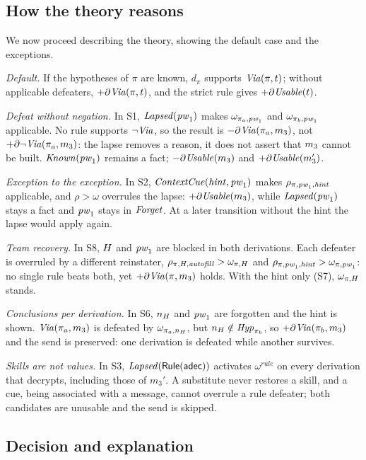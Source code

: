 \subsection{How the theory reasons}
\label{sec:patterns}
We now proceed describing the theory, showing the default case and the exceptions.

\emph{Default.} If the hypotheses of $\pi$ are known, $d_\pi$ supports $\mathit{Via}(\pi,t)$; without applicable defeaters, $+\partial\mathit{Via}(\pi,t)$, and the strict rule gives $+\partial\mathit{Usable}(t)$.

\emph{Defeat without negation.} In S1, $\mathit{Lapsed}(\mathit{pw}_1)$ makes $\omega_{\pi_a,\mathit{pw}_1}$ and $\omega_{\pi_b,\mathit{pw}_1}$ applicable. No rule supports $\neg\mathit{Via}$, so the result is $-\partial\mathit{Via}(\pi_a,m_3)$, not $+\partial\neg\mathit{Via}(\pi_a,m_3)$: the lapse removes a reason, it does not assert that $m_3$ cannot be built. $\mathit{Known}(\mathit{pw}_1)$ remains a fact; $-\partial\mathit{Usable}(m_3)$ and $+\partial\mathit{Usable}(m_3')$.

\emph{Exception to the exception.} In S2, $\mathit{ContextCue}(\mathit{hint},\mathit{pw}_1)$ makes $\rho_{\pi,\mathit{pw}_1,\mathit{hint}}$ applicable, and $\rho>\omega$ overrules the lapse: $+\partial\mathit{Usable}(m_3)$, while $\mathit{Lapsed}(\mathit{pw}_1)$ stays a fact and $\mathit{pw}_1$ stays in $\mathit{Forget}$. At a later transition without the hint the lapse would apply again.

\emph{Team recovery.} In S8, $H$ and $\mathit{pw}_1$ are blocked in both derivations. Each defeater is overruled by a different reinstater, $\rho_{\pi,H,\mathit{autofill}}>\omega_{\pi,H}$ and $\rho_{\pi,\mathit{pw}_1,\mathit{hint}}>\omega_{\pi,\mathit{pw}_1}$: no single rule beats both, yet $+\partial\mathit{Via}(\pi,m_3)$ holds. With the hint only (S7), $\omega_{\pi,H}$ stands.

\emph{Conclusions per derivation.} In S6, $n_H$ and $\mathit{pw}_1$ are forgotten and the hint is shown. $\mathit{Via}(\pi_a,m_3)$ is defeated by $\omega_{\pi_a,n_H}$, but $n_H\notin\mathit{Hyp}_{\pi_b}$, so $+\partial\mathit{Via}(\pi_b,m_3)$ and the send is preserved: one derivation is defeated while another survives.

\emph{Skills are not values.} In S3, $\mathit{Lapsed}(\mathsf{Rule}(\mathsf{adec}))$ activates $\omega^{\mathit{rule}}$ on every derivation that decrypts, including those of $m_3'$. A substitute never restores a skill, and a cue, being associated with a message, cannot overrule a rule defeater; both candidates are unusable and the send is skipped.

\subsection{Decision and explanation}
\label{sec:decision}

